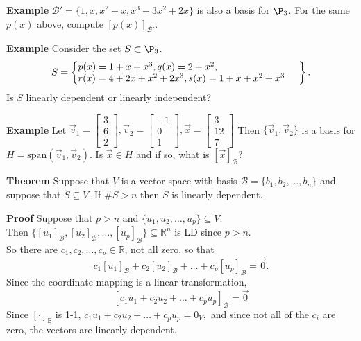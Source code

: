  \begin{frame}[fragile]

\textbf{Example}
${\mathcal B'} = \{1, x, x^2-x, x^3-3x^2 + 2 x\}$ is also a basis for $\P_3$.
For the same $p(x)$ above, compute $[p(x)]_{\mathcal B'}$.



\textbf{Example}
Consider the set $S \subset \P_3$.
\[
S=\left\{ \parbox{80mm}{$p(x)=1+x+x^3,q(x)=2+x^2$, \\ $r(x)=4+2x+x^2+2x^3,s(x)=1+x+x^2+x^3$} \right \}.
\]
Is $S$ linearly dependent or linearly independent?



\textbf{Example}
 Let $\vec{v}_1 = \left[\begin{array}{rrrrrr}3 \\ 6 \\ 2 \end{array} \right] ,
\vec{v}_2=\left[\begin{array}{rrrrrr} -1 \\ 0 \\ 1 \end{array} \right] , 
\vec{x}=\left[\begin{array}{rrrrrr} 3 \\ 12 \\ 7 \end{array} \right] $
Then $\{ \vec{v}_1, \vec{v}_2 \}$ is a basis for 
$H = \mbox{span}(\vec{v}_1, \vec{v}_2)$.  Is $\vec{x} \in H$ and if 
so, what is $[ \vec{x} ]_{\mathcal B}$?

\end{frame}





 \begin{frame}[fragile]
\textbf{Theorem}
Suppose that $V$ is a vector space with basis 
${\mathcal B} = \{{b}_1, {b}_2, \dots , {b}_n  \}$ and suppose that $S\subseteq V$.  If $\#S>n$ then $S$ is linearly dependent. 



\textbf{Proof}
Suppose that $p>n$ and 
$\{{u}_1, {u}_2, \dots , {u}_p\} \subseteq V$.  \\ 
Then
$\{ [{u}_1]_{\mathcal B}, [{u}_2]_{\mathcal B}, \dots , 
[{u}_p]_{\mathcal B} \}  \subseteq \mathbb R^n$ is LD since 
$p>n$.  \\ 
So there are $c_1, c_2, \dots, c_p \in \mathbb R$, not all zero, so that 
\[
c_1[{u}_1]_{\mathcal B} + c_2 [{u}_2]_{\mathcal B} + \dots + 
c_p [{u}_p]_{\mathcal B} = \vec{0}.
\]  
Since the coordinate mapping is a linear transformation, 
\[
[ c_1{u}_1 + c_2 {u}_2 + \dots + 
c_p {u}_p]_{\mathcal B} = \vec{0}
\]  
Since $[\cdot]_{\mathbb B}$ is 1-1,
$c_1{u}_1 + c_2 {u}_2 + \dots + c_p {u}_p = 0_V,$  and since not all of the $c_i$ are zero, the 
vectors are linearly dependent.

\end{frame}






